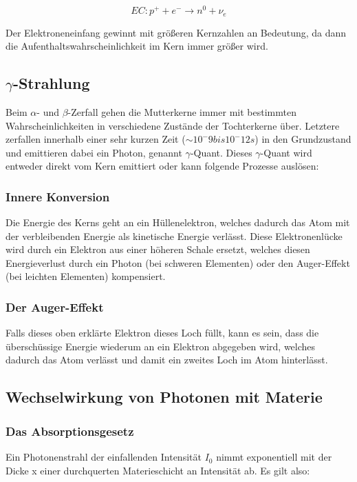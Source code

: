 $$ EC: p^+ + e^- \rightarrow n^0 + \nu_e $$

Der Elektroneneinfang gewinnt mit größeren Kernzahlen an Bedeutung, da dann die Aufenthaltswahrscheinlichkeit im Kern immer größer wird.

\subsection{$\gamma$-Strahlung}

Beim $\alpha$- und $\beta$-Zerfall gehen die Mutterkerne immer mit bestimmten Wahrscheinlichkeiten in verschiedene Zustände der Tochterkerne über. Letztere zerfallen innerhalb einer sehr kurzen Zeit ($\sim 10^-9 bis 10^-12 s$) in den Grundzustand und emittieren dabei ein Photon, genannt $\gamma$-Quant. Dieses $\gamma$-Quant wird entweder direkt vom Kern emittiert oder kann folgende Prozesse auslösen:

\subsubsection{Innere Konversion}

Die Energie des Kerns geht an ein Hüllenelektron, welches dadurch das Atom mit der verbleibenden Energie als kinetische Energie verlässt. Diese Elektronenlücke wird durch ein Elektron aus einer höheren Schale ersetzt, welches diesen Energieverlust durch ein Photon (bei schweren Elementen) oder den Auger-Effekt (bei leichten Elementen) kompensiert.

\subsubsection{Der Auger-Effekt}

Falls dieses oben erklärte Elektron dieses Loch füllt, kann es sein, dass die überschüssige Energie wiederum an ein Elektron abgegeben wird, welches dadurch das Atom verlässt und damit ein zweites Loch im Atom hinterlässt.


\subsection{Wechselwirkung von Photonen mit Materie}

\subsubsection{Das Absorptionsgesetz}

Ein Photonenstrahl der einfallenden Intensität $I_0$ nimmt exponentiell mit der Dicke x einer durchquerten Materieschicht an Intensität ab. Es gilt also:

